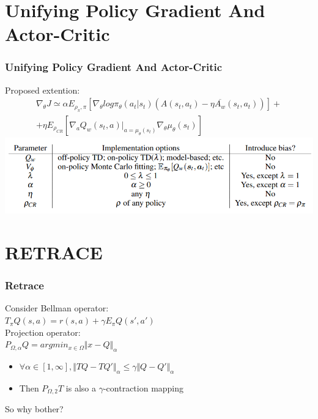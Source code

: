 \documentclass{beamer}
\begin{document}
\section{Unifying Policy Gradient And Actor-Critic}

\begin{frame}[t]
\frametitle{Unifying Policy Gradient And Actor-Critic}

Proposed extention:
\begin{multline*}
\nabla_{\theta} J \simeq \alpha E_{\rho_\pi, \pi} \left[ \nabla_{\theta} log \pi_\theta ( a_t | s_t) (A(s_t, a_t) - \eta \overline{A_w} (s_t,a_t)) \right] + \\ + \eta E_{\rho_{CR}} \left[ \nabla_a Q_w(s_t, a) |_{a=\mu_\theta(s_t)} 
\nabla_\theta \mu_\theta(s_t)
\right]
\end{multline*}
\includegraphics[scale=0.37]{extention}

\end{frame}

\section{RETRACE}


\begin{frame}
\frametitle{Retrace}
Consider Bellman operator:\\
$T_\pi Q (s,a) = r(s,a) + \gamma E_\pi Q(s',a')$\\

\vspace{3mm}
Projection operator:\\
$P_{\Omega, \alpha} Q = argmin_{x \in \Omega} \Vert x - Q \Vert_\alpha$\\

\vspace{3mm}

\begin{itemize}
\item $ \forall \alpha \in [1,\infty], \Vert TQ - TQ' \Vert_\alpha \leq \gamma \Vert Q - Q' \Vert_\alpha$
\item Then $P_{\Omega, 2} T$ is also a $\gamma$-contraction mapping
\end{itemize}

\vspace{3mm}
So why bother?

\end{frame}
\end{document}
